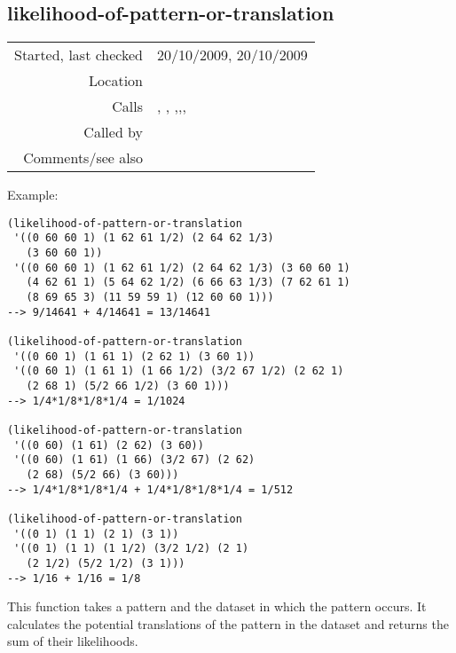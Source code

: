 \subsection*{likelihood-of-pattern-or-translation}\label{fun:likelihood-of-pattern-or-translation}

\vspace{0.3cm}
\begin{tabular}{r|p{8cm}}
Started, last checked & 20/10/2009, 20/10/2009 \\
Location & \nameref{sec:empirical-preliminaries} \\
Calls & \nameref{fun:constant-vector}, 
\newline \nameref{fun:direct-product-of-n-sets}, \nameref{fun:empirical-mass},\newline \nameref{fun:likelihood-of-subset},\newline \nameref{fun:orthogonal-projection-not-unique-equalp}, \nameref{fun:potential-n-dim-translations} \\
Called by & \\
Comments/see also & \nameref{fun:likelihood-of-translations-geometric-mean}
\end{tabular}

\vspace{0.5cm}
\noindent Example:
\begin{verbatim}
(likelihood-of-pattern-or-translation
 '((0 60 60 1) (1 62 61 1/2) (2 64 62 1/3)
   (3 60 60 1))
 '((0 60 60 1) (1 62 61 1/2) (2 64 62 1/3) (3 60 60 1)
   (4 62 61 1) (5 64 62 1/2) (6 66 63 1/3) (7 62 61 1)
   (8 69 65 3) (11 59 59 1) (12 60 60 1)))
--> 9/14641 + 4/14641 = 13/14641

(likelihood-of-pattern-or-translation
 '((0 60 1) (1 61 1) (2 62 1) (3 60 1))
 '((0 60 1) (1 61 1) (1 66 1/2) (3/2 67 1/2) (2 62 1) 
   (2 68 1) (5/2 66 1/2) (3 60 1)))
--> 1/4*1/8*1/8*1/4 = 1/1024

(likelihood-of-pattern-or-translation
 '((0 60) (1 61) (2 62) (3 60))
 '((0 60) (1 61) (1 66) (3/2 67) (2 62) 
   (2 68) (5/2 66) (3 60)))
--> 1/4*1/8*1/8*1/4 + 1/4*1/8*1/8*1/4 = 1/512

(likelihood-of-pattern-or-translation
 '((0 1) (1 1) (2 1) (3 1))
 '((0 1) (1 1) (1 1/2) (3/2 1/2) (2 1) 
   (2 1/2) (5/2 1/2) (3 1)))
--> 1/16 + 1/16 = 1/8
\end{verbatim}

\noindent This function takes a pattern and the
dataset in which the pattern occurs. It calculates the
potential translations of the pattern in the dataset
and returns the sum of their likelihoods.


